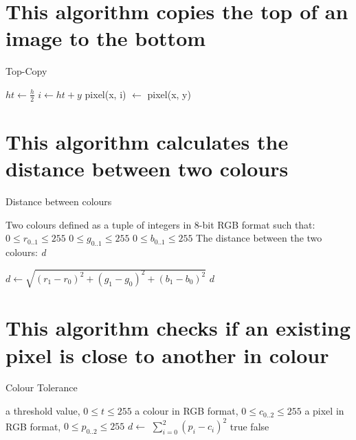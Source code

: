 \documentclass{../../../fal_assignment}
\begin{document}
	\clearpage
	\section{This algorithm copies the top of an image to the bottom}
	\begin{algorithm}[ht]
	\caption{Top-Copy}
	\label{alg:algorithm}
	
	\begin{algorithmic}[1]
		   \State $ht \leftarrow \frac{h}{2}$
			\State $i \leftarrow ht + y$
			\State pixel(x, i) $\leftarrow$ pixel(x, y)
			\EndFor
	\end{algorithmic}
	
\end{algorithm}

	\clearpage
	\section{This algorithm calculates the distance between two colours}
	\begin{algorithm}[ht]
	\caption{Distance between colours}
	\label{alg:algorithm}
	
\begin{algorithmic}[1]
	\Require 
	\Statex Two colours defined as a tuple of integers in 8-bit RGB format such that:
	\Statex $0 \leq r_{0..1} \leq 255$
	\Statex $0 \leq g_{0..1} \leq 255$
	\Statex $0 \leq b_{0..1} \leq 255$
	\Ensure
	\Statex The distance between the two colours:
	\Statex \textit{d}
	
	\Statex
	
	\State $d \leftarrow \sqrt{ (r_1 - r_0)^2 + (g_1 - g_0)^2 + (b_1 - b_0)^2}$
	\State \Return $d$
\end{algorithmic}
	
\end{algorithm}

	\clearpage
	\section{This algorithm checks if an existing pixel is close to another in colour}
	\begin{algorithm}[ht]
	\caption{Colour Tolerance}
	\label{alg:algorithm}
	
	\begin{algorithmic}[1]
		\Require
		\Statex a threshold value,  $0 \leq t \leq 255$
		\Statex a colour in RGB format,  $0 \leq c_{0..2} \leq 255$
		\Statex a pixel in RGB format,  $0 \leq p_{0..2} \leq 255$
		\State $d \leftarrow$ $\sum_{i=0}^{2} ( p_i - c_i) ^2$
		\State \Return true
		\Else
		\State \Return false
		\EndIf
		\EndFunction
	\end{algorithmic}
	
\end{algorithm}
\end{document}
